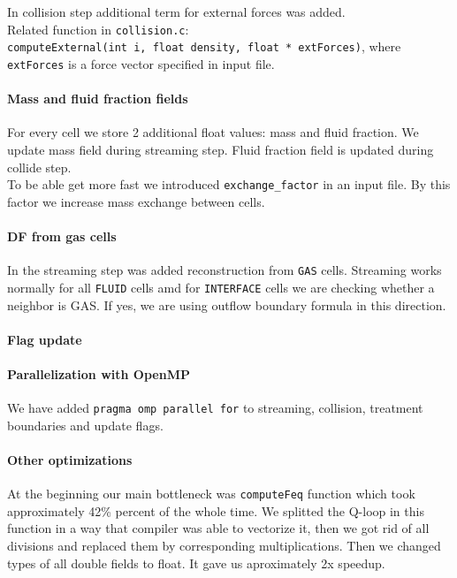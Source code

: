 \documentclass{article}
\begin{document}
In collision step additional term for external forces was added.\\
Related function in \texttt{collision.c}:
\texttt{computeExternal(int\ i,\ float\ density,\ float\ *\ extForces)},
where \texttt{extForces} is a force vector specified in input file.

\paragraph{Mass and fluid fraction
fields}\label{mass-and-fluid-fraction-fields}

For every cell we store 2 additional float values: mass and fluid
fraction. We update mass field during streaming step. Fluid fraction
field is updated during collide step.\\
To be able get more fast we introduced \texttt{exchange\_factor} in an
input file. By this factor we increase mass exchange between cells.

\paragraph{DF from gas cells}\label{df-from-gas-cells}

In the streaming step was added reconstruction from \texttt{GAS} cells.
Streaming works normally for all \texttt{FLUID} cells amd for
\texttt{INTERFACE} cells we are checking whether a neighbor is GAS. If
yes, we are using outflow boundary formula in this direction.

\paragraph{Flag update}\label{flag-update}

\paragraph{Parallelization with
OpenMP}\label{parallelization-with-openmp}

We have added \texttt{pragma\ omp\ parallel\ for} to streaming,
collision, treatment boundaries and update flags.

\paragraph{Other optimizations}\label{other-optimizations}

At the beginning our main bottleneck was \texttt{computeFeq} function
which took approximately 42\% percent of the whole time. We splitted the
Q-loop in this function in a way that compiler was able to vectorize it,
then we got rid of all divisions and replaced them by corresponding
multiplications. Then we changed types of all double fields to float. It
gave us aproximately 2x speedup.
\end{document}
